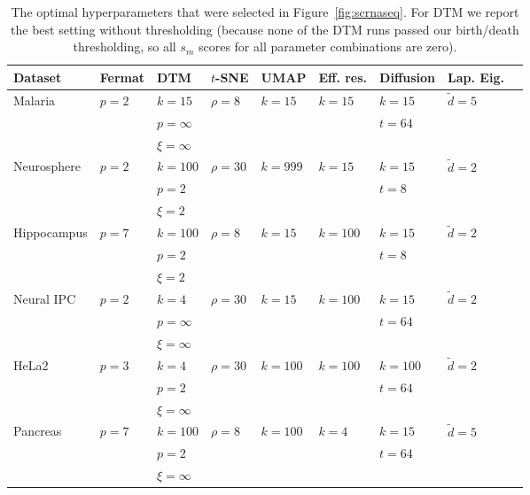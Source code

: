 \documentclass{article}
\theoremstyle{plain}
\theoremstyle{definition}
\theoremstyle{remark}
\begin{document}
\begin{table}[t]
    \centering
    \caption{The optimal hyperparameters that were selected in Figure~\ref{fig:scrnaseq}. For DTM we report the best setting without thresholding (because none of the DTM runs passed our birth/death thresholding, so all $s_m$ scores for all parameter combinations are zero).}
    \begin{tabular}{lllllllll}
    \toprule
    Dataset & Fermat & DTM & $t$-SNE & UMAP & Eff. res. & Diffusion & Lap. Eig.\\ 
    \midrule
    Malaria     & $p=2$ & $k=15$       & $\rho=8$  & $k=15$  & $k=15$  & $k=15$  & $\tilde{d}=5$ \\
                &       & $p=\infty$   &           &         &         & $t=64$  &        \\
                &       & $\xi=\infty$ &           &         &         &         &        \\
    Neurosphere & $p=2$ & $k=100$      & $\rho=30$ & $k=999$ & $k=15$  & $k=15$  & $\tilde{d}=2$ \\
                &       & $p=2$        &           &         &         & $t=8$   &        \\
                &       & $\xi=2$      &           &         &         &         &        \\
    Hippocampus & $p=7$ & $k=100$      & $\rho=8$  & $k=15$  & $k=100$ & $k=15$  & $\tilde{d}=2$\\
                &       & $p=2$        &           &         &         & $t=8$   &        \\
                &       & $\xi=2$      &           &         &         &         &        \\
    Neural IPC  & $p=2$ & $k=4$        & $\rho=30$ & $k=15$  & $k=100$ & $k=15$  & $\tilde{d}=2$ \\
                &       & $p=\infty$   &           &         &         & $t=64$   &        \\
                &       & $\xi=\infty$ &           &         &         &         &        \\
    HeLa2       & $p=3$ & $k=4$        & $\rho=30$ & $k=100$ & $k=100$ & $k=100$ & $\tilde{d}=2$ \\
                &       & $p=2$        &           &         &         & $t=64$   &        \\
                &       & $\xi=\infty$ &           &         &         &         &        \\
    Pancreas    & $p=7$ & $k=100$      & $\rho=8$  & $k=100$ & $k=4$   & $k=15$  & $\tilde{d}=5$\\
                &       & $p=2$        &           &         &         & $t=64$  &        \\
                &       & $\xi=\infty$ &           &         &         &         &        \\
    \bottomrule
    \end{tabular}
    \label{tab:hyperparameters_scrnaseq}
\end{table}
\end{document}

